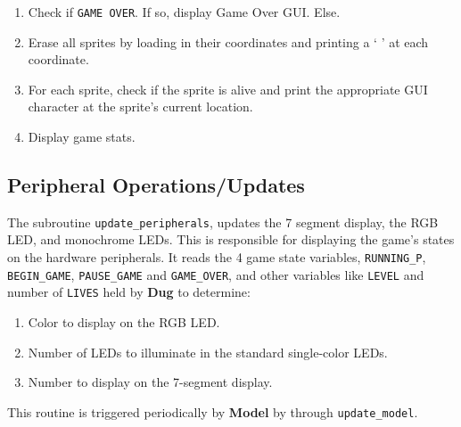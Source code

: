     \begin{enumerate}
      \item Check if \texttt{GAME OVER}. If so, display Game Over GUI. Else.
      \item Erase all sprites by loading in their coordinates and printing a ` ' at each coordinate.
      \item For each sprite, check if the sprite is alive and print the appropriate GUI character at the sprite's current location.
      \item Display game stats.
    \end{enumerate}


  \subsection{Peripheral Operations/Updates}
 
  The subroutine \texttt{update\_peripherals}, updates the 7 segment display, the RGB LED,
  and monochrome LEDs. This is responsible for displaying the game's states on the hardware
  peripherals. It reads the 4 game state variables, \texttt{RUNNING\_P}, \texttt{BEGIN\_GAME},
  \texttt{PAUSE\_GAME} and \texttt{GAME\_OVER}, and other variables like \texttt{LEVEL} and number of \texttt{LIVES}
  held by \textbf{Dug} to determine:
  
  \begin{enumerate}
    \item Color to display on the RGB LED.
    \item Number of LEDs to illuminate in the standard single-color LEDs.
    \item Number to display on the 7-segment display.
  \end{enumerate}

  This routine is triggered periodically by \textbf{Model} by through \texttt{update\_model}.

